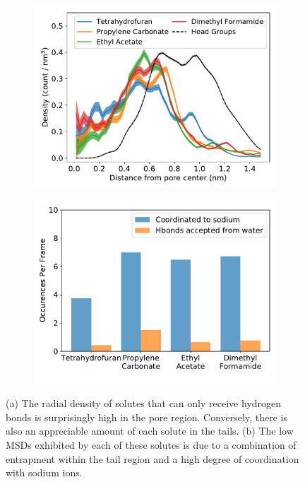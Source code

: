 \documentclass{article}
\begin{document}
  \begin{figure}[!htb]
  \centering
  \begin{subfigure}{0.45\textwidth}
  \includegraphics[width=\textwidth]{nondonors_rdf.pdf}
  \caption{}\label{fig:nondonors_rdf}
  \end{subfigure}
  \begin{subfigure}{0.45\textwidth}
  \includegraphics[width=\textwidth]{nondonor_hbonds.pdf}
  \caption{}\label{fig:nondonors_hbonds}
  \end{subfigure}
  \caption{(a) The radial density of solutes that can only receive hydrogen bonds
  is surprisingly high in the pore region. Conversely, there is also an appreciable
  amount of each solute in the tails. (b) The low MSDs exhibited by each of these
  solutes is due to a combination of entrapment within the tail region and a high 
  degree of coordination with sodium ions.}\label{fig:nondonors}
  \end{figure}
  
\end{document}
